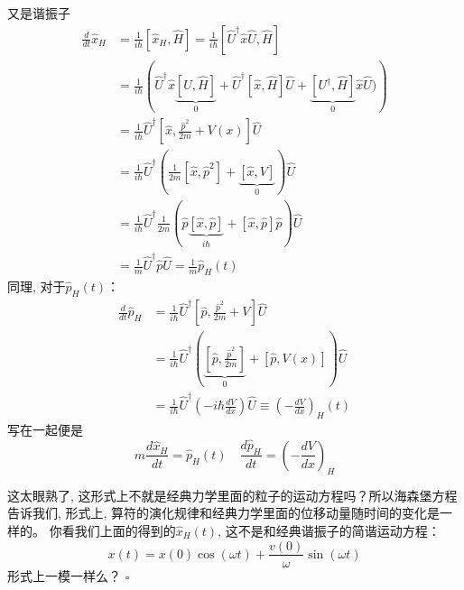 \documentclass[a4paper,zihao=-4,linespread=1]{ctexrep}
\begin{document}
\begin{example}{又是谐振子}
\begin{equation}
\begin{aligned}
                \frac{d}{d t} \hat{x}_{H} &=\frac{1}{i \hbar}\left[\hat{x}_{H}, \hat{H}\right]=\frac{1}{i \hbar}\left[\hat{U}^{\dagger} \hat{x} \hat{U}, \hat{H}\right] \\
                &=\frac{1}{i \hbar}\left(\hat{U}^{\dagger} \hat{x}\underbrace{\left[\hat{U}, \hat{H}\right ]}_{0}+\hat{U}^{\dagger}[\hat{x}, \hat{H}] \hat{U}+\underbrace{\left[U^{\dagger}, \hat{H}\right]}_{0} \hat{x} \hat{U})\right)\\
                &=\frac{1}{i \hbar} \hat{U}^{\dagger}\left[\hat{x}, \frac{\hat{p}^{2}}{2 m}+V(x)\right] \hat{U} \\
                &=\frac{1}{i \hbar} \hat{U}^{\dagger}(\frac{1}{2 m}\left[\hat{x}, \hat{p}^{2}\right]+\underbrace{[\hat{x}, V]}_{0}) \hat{U} \\
                &=\frac{1}{i \hbar} \hat{U}^{\dagger} \frac{1}{2 m}(\hat{p} \underbrace{[\hat{x}, \hat{p}]}_{i \hbar}+[\hat{x}, \hat{p}] \hat{p}) \hat{U} \\
                &=\frac{1}{m} \hat{U}^{\dagger} \hat{p} \hat{U}=\frac{1}{m} \hat{p}_{H}(t) 
            \end{aligned}
        \end{equation}
        同理, 对于$\hat{p}_H(t)$：
        \begin{equation}
            \begin{aligned}
                \frac{d}{d t} \hat{p}_{H} &=\frac{1}{i \hbar} \hat{U}^{\dagger}\left[\hat{p}, \frac{\hat{p}^{2}}{2 m}+V\right] \hat{U} \\
                &=\frac{1}{i \hbar} \hat{U}^{\dagger}\left(\underbrace{\left[\hat{p}, \frac{\hat{p}^{2}}{2 m}\right]}_{0}+[\hat{p}, V(x)]\right) \hat{U} \\
                &=\frac{1}{i \hbar} \hat{U}^{\dagger}\left(-i \hbar \frac{d V}{d x}\right) \hat{U}\equiv \left(-\frac{d V}{d x}\right)_{H}(t)
            \end{aligned}
        \end{equation}
        写在一起便是
        \begin{equation}
            \boxed{m \frac{d \hat{x}_{H}}{d t}=\hat{p}_{H}(t) \quad \frac{d \hat{p}_{H}}{d t}=\left(-\frac{d V}{d x}\right)_{H}}
        \end{equation}

        \setlength\parindent{2em}这太眼熟了, 这形式上不就是经典力学里面的粒子的运动方程吗？所以海森堡方程告诉我们, 形式上, 算符的演化规律和经典力学里面的位移动量随时间的变化是一样的。
        你看我们上面的得到的$\hat{x}_H(t)$, 这不是和经典谐振子的简谐运动方程：
        \[x(t)=x(0)\cos(\omega t)+\frac{v(0)}{\omega}\sin (\omega t)\]
        形式上一模一样么？
        \hfill $\square$\par
    \end{example}
\end{document}
